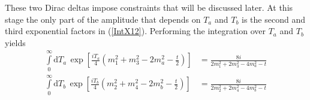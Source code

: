 These two Dirac deltas impose constraints that will be discussed later. At this stage the only part of the amplitude that depends on $T_{a}$ and $T_{b}$ is the second and third exponential factors in (\ref{IntX12}). Performing the integration over $T_{a}$ and $T_{b}$ yields
\begin{equation}
\begin{split}
	\int\limits_{0}^{\infty} \mathrm{d}T_{a} \, \exp{\left[ \frac{i T_{a}}{4} \left(m_{1}^{2} + m_{3}^{2} - 2 m_{a}^{2} - \frac{t}{2} \right) \right] } &= \frac{8i}{2 m_{1}^{2} + 2 m_{3}^{2} - 4 m_{a}^{2} - t} \\
	\int\limits_{0}^{\infty} \mathrm{d}T_{b} \, \exp{\left[ \frac{i T_{b}}{4} \left(m_{2}^{2} + m_{4}^{2} - 2 m_{b}^{2} - \frac{t}{2} \right) \right]} &= \frac{8i}{2 m_{2}^{2} + 2 m_{4}^{2} - 4 m_{b}^{2} - t}
\end{split} \label{IntTaTbTrunc}
\end{equation}

